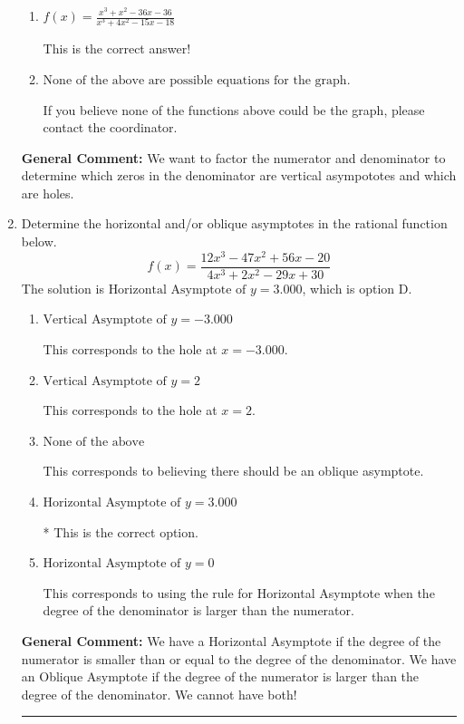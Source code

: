 \documentclass{extbook}[14pt]
\newcommand{\litem}[1]{\item #1

\rule{\textwidth}{0.4pt}}
\begin{document}
\begin{enumerate}
{\begin{enumerate}[label=\Alph*.]
You treated all of the zeros in the denominator as vertical asymptotes when some of them were holes!
\item \( f(x)=\frac{x^{3} + x^{2} -36 x -36}{x^{3} +4 x^{2} -15 x -18} \)

This is the correct answer!
\item \( \text{None of the above are possible equations for the graph.} \)

If you believe none of the functions above could be the graph, please contact the coordinator.
\end{enumerate}

\textbf{General Comment:} We want to factor the numerator and denominator to determine which zeros in the denominator are vertical asympototes and which are holes.
}
\litem{
Determine the horizontal and/or oblique asymptotes in the rational function below.
\[ f(x) = \frac{12x^{3} -47 x^{2} +56 x -20}{4x^{3} +2 x^{2} -29 x + 30} \]The solution is \( \text{Horizontal Asymptote of } y = 3.000  \), which is option D.\begin{enumerate}[label=\Alph*.]
\item \( \text{Vertical Asymptote of } y = -3.000  \)

This corresponds to the hole at $x = -3.000$.
\item \( \text{Vertical Asymptote of } y = 2  \)

This corresponds to the hole at $x = 2$.
\item \( \text{None of the above} \)

This corresponds to believing there should be an oblique asymptote.
\item \( \text{Horizontal Asymptote of } y = 3.000  \)

* This is the correct option.
\item \( \text{Horizontal Asymptote of } y = 0  \)

This corresponds to using the rule for Horizontal Asymptote when the degree of the denominator is larger than the numerator.
\end{enumerate}

\textbf{General Comment:} We have a Horizontal Asymptote if the degree of the numerator is smaller than or equal to the degree of the denominator. We have an Oblique Asymptote if the degree of the numerator is larger than the degree of the denominator. We cannot have both!
}
\end{enumerate}
\end{document}
